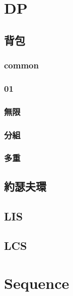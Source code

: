 \section{DP}

\subsection{背包}

\subsubsection{common}


\subsubsection{01}


\subsubsection{無限}


\subsubsection{分組}


\subsubsection{多重}


\subsection{約瑟夫環}


\subsection{LIS}


\subsection{LCS}


\section{Sequence}

